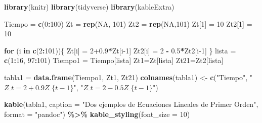 \documentclass[
]{book}
\newenvironment{Shaded}{\begin{snugshade}}{\end{snugshade}}
\newcommand{\AttributeTok}[1]{\textcolor[rgb]{0.13,0.29,0.53}{#1}}
\newcommand{\ConstantTok}[1]{\textcolor[rgb]{0.56,0.35,0.01}{#1}}
\newcommand{\ControlFlowTok}[1]{\textcolor[rgb]{0.13,0.29,0.53}{\textbf{#1}}}
\newcommand{\DecValTok}[1]{\textcolor[rgb]{0.00,0.00,0.81}{#1}}
\newcommand{\FloatTok}[1]{\textcolor[rgb]{0.00,0.00,0.81}{#1}}
\newcommand{\FunctionTok}[1]{\textcolor[rgb]{0.13,0.29,0.53}{\textbf{#1}}}
\newcommand{\NormalTok}[1]{#1}
\newcommand{\OtherTok}[1]{\textcolor[rgb]{0.56,0.35,0.01}{#1}}
\newcommand{\SpecialCharTok}[1]{\textcolor[rgb]{0.81,0.36,0.00}{\textbf{#1}}}
\newcommand{\StringTok}[1]{\textcolor[rgb]{0.31,0.60,0.02}{#1}}
\begin{document}
\begin{Shaded}
\begin{Highlighting}[]
\FunctionTok{library}\NormalTok{(knitr)}
\FunctionTok{library}\NormalTok{(tidyverse)}
\FunctionTok{library}\NormalTok{(kableExtra)}

\NormalTok{Tiempo }\OtherTok{=} \FunctionTok{c}\NormalTok{(}\DecValTok{0}\SpecialCharTok{:}\DecValTok{100}\NormalTok{)}
\NormalTok{Zt }\OtherTok{=} \FunctionTok{rep}\NormalTok{(}\ConstantTok{NA}\NormalTok{, }\DecValTok{101}\NormalTok{)}
\NormalTok{Zt2 }\OtherTok{=} \FunctionTok{rep}\NormalTok{(}\ConstantTok{NA}\NormalTok{,}\DecValTok{101}\NormalTok{)}
\NormalTok{Zt[}\DecValTok{1}\NormalTok{] }\OtherTok{=} \DecValTok{10}
\NormalTok{Zt2[}\DecValTok{1}\NormalTok{] }\OtherTok{=} \DecValTok{10}

\ControlFlowTok{for}\NormalTok{ (i }\ControlFlowTok{in} \FunctionTok{c}\NormalTok{(}\DecValTok{2}\SpecialCharTok{:}\DecValTok{101}\NormalTok{))\{}
\NormalTok{  Zt[i] }\OtherTok{=} \DecValTok{2}\FloatTok{+0.9}\SpecialCharTok{*}\NormalTok{Zt[i}\DecValTok{{-}1}\NormalTok{]}
\NormalTok{  Zt2[i] }\OtherTok{=} \DecValTok{2} \SpecialCharTok{{-}} \FloatTok{0.5}\SpecialCharTok{*}\NormalTok{Zt2[i}\DecValTok{{-}1}\NormalTok{]}
\NormalTok{\}}
\NormalTok{lista }\OtherTok{=} \FunctionTok{c}\NormalTok{(}\DecValTok{1}\SpecialCharTok{:}\DecValTok{16}\NormalTok{, }\DecValTok{97}\SpecialCharTok{:}\DecValTok{101}\NormalTok{)}
\NormalTok{Tiempo1 }\OtherTok{=}\NormalTok{ Tiempo[lista]}
\NormalTok{Zt1}\OtherTok{=}\NormalTok{Zt[lista]}
\NormalTok{Zt21}\OtherTok{=}\NormalTok{Zt2[lista]}

\NormalTok{tabla1 }\OtherTok{=} \FunctionTok{data.frame}\NormalTok{(Tiempo1, Zt1, Zt21)}
\FunctionTok{colnames}\NormalTok{(tabla1) }\OtherTok{\textless{}{-}} \FunctionTok{c}\NormalTok{(}\StringTok{"Tiempo"}\NormalTok{, }\StringTok{"$Z\_t =2+0.9Z\_\{t{-}1\}$"}\NormalTok{, }
                      \StringTok{"$Z\_t = 2{-}0.5Z\_\{t{-}1\}$"}\NormalTok{)}

\FunctionTok{kable}\NormalTok{(tabla1, }
      \AttributeTok{caption =} \StringTok{"Dos ejemplos de Ecuaciones Lineales de Primer Orden"}\NormalTok{, }
      \AttributeTok{format =} \StringTok{"pandoc"}\NormalTok{) }\SpecialCharTok{\%\textgreater{}\%}
  \FunctionTok{kable\_styling}\NormalTok{(}\AttributeTok{font\_size =} \DecValTok{10}\NormalTok{)}
\end{Highlighting}
\end{Shaded}
\end{document}
